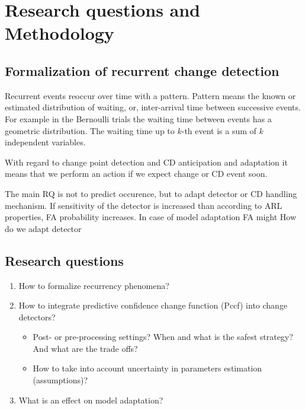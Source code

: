 \chapter{Research questions and Methodology}

\section{Formalization of recurrent change detection}
Recurrent events reoccur over time with a pattern.
Pattern means the known or estimated distribution of waiting, or, inter-arrival time between successive events.
For example in the Bernoulli trials the waiting time between events has a geometric distribution.
The waiting time up to $k$-th event is a sum of $k$ independent variables.

With regard to change point detection and CD anticipation and adaptation it means that we perform an action if we expect change or CD event soon.

The main RQ is not to predict occurence, but to adapt detector or CD handling mechanism.
If sensitivity of the detector is increased than according to ARL properties, FA probability increases.
In case of model adaptation FA might
How do we adapt detector 


\section{Research questions}

\begin{enumerate}
  \item How to formalize recurrency phenomena?
  \item How to integrate predictive confidence change function (Pccf) into change detectors?
  \begin{itemize}
    \item Post- or pre-processing settings? When and what is the safest strategy? And what are the trade offs?
    \item How to take into account uncertainty in parameters estimation (assumptions)?
  \end{itemize}
  \item What is an effect on model adaptation?
\end{enumerate}

